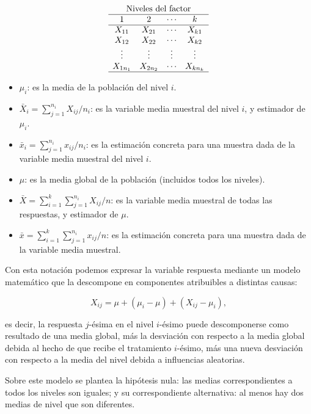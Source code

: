 \documentclass[
  spanish,
  a4paper,
]{scrreport}
\providecommand{\tightlist}{%
  \setlength{\itemsep}{0pt}\setlength{\parskip}{0pt}}
\theoremstyle{plain}
\theoremstyle{definition}
\theoremstyle{definition}
\theoremstyle{remark}
\begin{document}
\[
\begin{array}{c}
\mbox{Niveles del factor}\\
\begin{array}{cccc}
\hline
1 & 2 & \cdots & k\\
\hline
X_{11} & X_{21} & \cdots & X_{k1}\\
X_{12} & X_{22} & \cdots & X_{k2}\\
\vdots & \vdots & \vdots & \vdots\\
X_{1n_1} & X_{2n_2} & \cdots & X_{kn_k}\\
\hline
\end{array}
\end{array}
\]

\begin{itemize}
\tightlist
\item
  \(\mu_i\): es la media de la población del nivel \(i\).
\item
  \(\bar X_i = \sum_{j = 1}^{n_i} X_{ij}/n_i\): es la variable media
  muestral del nivel \(i\), y estimador de \(\mu_i\).
\item
  \(\bar x_i = \sum_{j = 1}^{n_i} x_{ij}/n_i\): es la estimación
  concreta para una muestra dada de la variable media muestral del nivel
  \(i\).
\item
  \(\mu\): es la media global de la población (incluidos todos los
  niveles).
\item
  \(\bar X  = \sum_{i = 1}^k \sum_{j = 1}^{n_i } X_{ij}/n\): es la
  variable media muestral de todas las respuestas, y estimador de
  \(\mu\).
\item
  \(\bar x  = \sum_{i = 1}^k \sum_{j = 1}^{n_i }x_{ij}/n\): es la
  estimación concreta para una muestra dada de la variable media
  muestral.
\end{itemize}

Con esta notación podemos expresar la variable respuesta mediante un
modelo matemático que la descompone en componentes atribuibles a
distintas causas:

\[
X_{ij} = \mu + (\mu_i-\mu) + (X_{ij}-\mu_i),
\]

es decir, la respuesta \(j\)-ésima en el nivel \(i\)-ésimo puede
descomponerse como resultado de una media global, más la desviación con
respecto a la media global debida al hecho de que recibe el tratamiento
\(i\)-ésimo, más una nueva desviación con respecto a la media del nivel
debida a influencias aleatorias.

Sobre este modelo se plantea la hipótesis nula: las medias
correspondientes a todos los niveles son iguales; y su correspondiente
alternativa: al menos hay dos medias de nivel que son diferentes.
\end{document}
